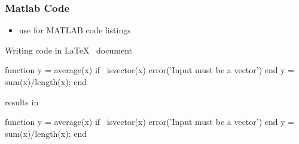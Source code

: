 \documentclass[report,english]{enacom}
\begin{document}
\subsubsection{Matlab Code}
    \begin{itemize}
        \item use  for MATLAB code listings
    \end{itemize}
    Writing code in \LaTeX ~ document
    \begin{lcode}
    \begin{mcode}
        function y = average(x)
            if ~isvector(x)
                error('Input must be a vector')
            end
            y = sum(x)/length(x); 
        end
    \end{mcode}
    \end{lcode}
    results in
    \begin{mcode}
	    function y = average(x)
    	if ~isvector(x)
        	error('Input must be a vector')
    	end
    	y = sum(x)/length(x); 
    	end
    \end{mcode}
\end{document}
